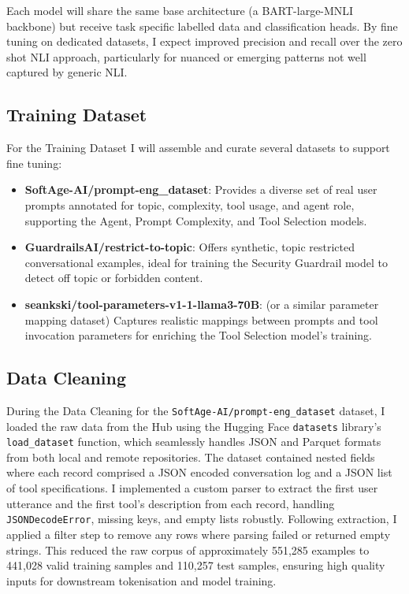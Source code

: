 Each model will share the same base architecture (a BART-large-MNLI backbone) but receive task specific labelled data and classification heads. By fine tuning on dedicated datasets, I expect improved precision and recall over the zero shot NLI approach, particularly for nuanced or emerging patterns not well captured by generic NLI.

\subsection{Training Dataset}
\label{training dataset}

For the Training Dataset I will assemble and curate several datasets to support fine tuning:
\begin{itemize}
    \item \textbf{SoftAge-AI/prompt-eng\_dataset}: Provides a diverse set of real user prompts annotated for topic, complexity, tool usage, and agent role, supporting the Agent, Prompt Complexity, and Tool Selection models.
    \item \textbf{GuardrailsAI/restrict-to-topic}: Offers synthetic, topic restricted conversational examples, ideal for training the Security Guardrail model to detect off topic or forbidden content.
    \item \textbf{seankski/tool-parameters-v1-1-llama3-70B}: (or a similar parameter mapping dataset) Captures realistic mappings between prompts and tool invocation parameters for enriching the Tool Selection model's training.
\end{itemize}

\subsection{Data Cleaning}
During the Data Cleaning for the \texttt{SoftAge-AI/prompt-eng\_dataset} dataset, I loaded the raw data from the Hub using the Hugging Face \texttt{datasets} library's \texttt{load\_dataset} function, which seamlessly handles JSON and Parquet formats from both local and remote repositories. The dataset contained nested fields where each record comprised a JSON encoded conversation log and a JSON list of tool specifications. I implemented a custom parser to extract the first user utterance and the first tool's description from each record, handling \texttt{JSONDecodeError}, missing keys, and empty lists robustly. Following extraction, I applied a filter step to remove any rows where parsing failed or returned empty strings. This reduced the raw corpus of approximately 551,285 examples to 441,028 valid training samples and 110,257 test samples, ensuring high quality inputs for downstream tokenisation and model training.



